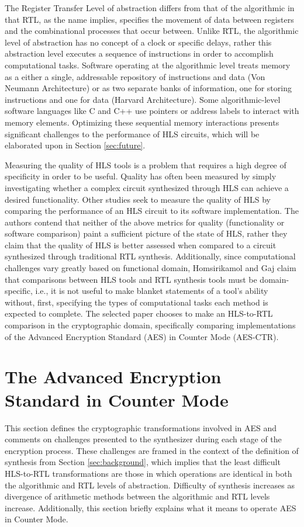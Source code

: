 \documentclass[11pt,journal,compsoc, onecolumn]{IEEEtran}
\begin{document}
The Register Transfer Level of abstraction differs from that of the algorithmic in that RTL, as the name implies, specifies the movement of data between registers and the combinational processes that occur  between. Unlike RTL, the algorithmic level of abstraction has no concept of a clock or specific delays, rather this abstraction level executes a sequence of instructions in order to accomplish computational tasks\cite{churtl}. Software operating at the algorithmic level treats memory as a either a single, addressable repository of instructions and data (Von Neumann Architecture) or as two separate banks of information, one for storing instructions and one for data (Harvard Architecture). Some algorithmic-level software languages like C and C++ use pointers or address labels to interact with memory elements. Optimizing these sequential memory interactions presents significant challenges to the performance of HLS circuits, which will be elaborated upon in Section \ref{sec:future}.

Measuring the quality of HLS tools is a problem that requires a high degree of specificity in order to be useful. Quality has often been measured by simply investigating whether a complex circuit synthesized through HLS can achieve a desired functionality\cite{8}\cite{9}\cite{10}\cite{11}\cite{12}. Other studies \cite{3}\cite{4} seek to measure the quality of HLS by comparing the performance of an HLS circuit to its software implementation. The authors contend that neither of the above metrics for quality (functionality or software comparison) paint a sufficient picture of the state of HLS, rather they claim that the quality of HLS is better assessed when compared to a circuit synthesized through traditional RTL synthesis. Additionally, since computational challenges vary greatly based on functional domain, Homsirikamol and Gaj claim that comparisons between HLS tools and RTL synthesis tools must be domain-specific, i.e., it is not useful to  make blanket statements of a tool's ability without, first, specifying the types of computational tasks each method is expected to complete. The selected paper chooses to make an HLS-to-RTL comparison in the cryptographic domain, specifically comparing implementations of the Advanced Encryption Standard (AES) in Counter Mode (AES-CTR).

\section{The Advanced Encryption Standard in Counter Mode}
This section defines the cryptographic transformations involved in AES and comments on challenges presented to the synthesizer during each stage of the encryption process. These challenges are framed in the context of the definition of synthesis from Section \ref{sec:background}, which implies that the least difficult HLS-to-RTL transformations are those in which operations are identical in both the algorithmic and RTL levels of abstraction. Difficulty of synthesis increases as divergence of arithmetic methods between the algorithmic and RTL levels increase. Additionally, this section briefly explains what it means to operate AES in Counter Mode. 
\end{document}
